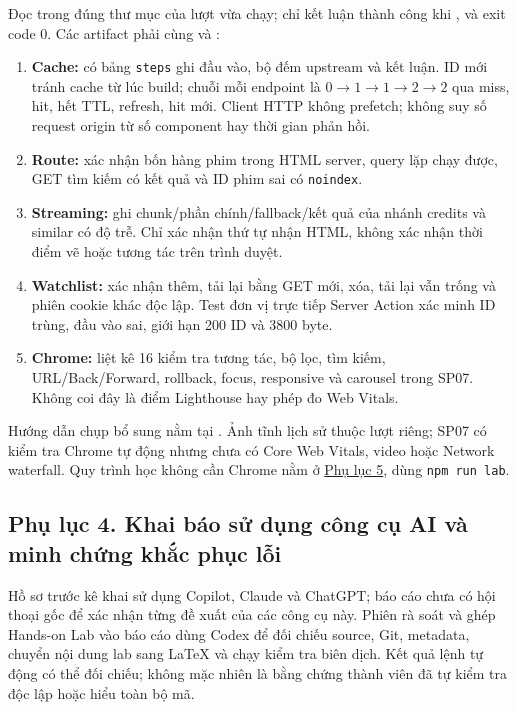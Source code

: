 \documentclass[12pt,a4paper]{extarticle}
\begin{document}
Đọc  trong đúng thư mục của lượt vừa chạy; chỉ kết luận thành công khi ,  và exit code 0. Các artifact phải cùng  và :
\begin{enumerate}[noitemsep]
    \item \textbf{Cache:}  có bảng \texttt{steps} ghi đầu vào, bộ đếm upstream và kết luận. ID mới tránh cache từ lúc build; chuỗi mỗi endpoint là $0\to1\to1\to2\to2$ qua miss, hit, hết TTL, refresh, hit mới. Client HTTP không prefetch; không suy số request origin từ số component hay thời gian phản hồi.
    \item \textbf{Route:}  xác nhận bốn hàng phim trong HTML server, query lặp chạy được, GET tìm kiếm có kết quả và ID phim sai có \texttt{noindex}.
    \item \textbf{Streaming:}  ghi chunk/phần chính/fallback/kết quả của nhánh credits và similar có độ trễ. Chỉ xác nhận thứ tự nhận HTML, không xác nhận thời điểm vẽ hoặc tương tác trên trình duyệt.
    \item \textbf{Watchlist:}  xác nhận thêm, tải lại bằng GET mới, xóa, tải lại vẫn trống và phiên cookie khác độc lập. Test đơn vị trực tiếp Server Action xác minh ID trùng, đầu vào sai, giới hạn 200 ID và 3800 byte.
    \item \textbf{Chrome:}  liệt kê 16 kiểm tra tương tác, bộ lọc, tìm kiếm, URL/Back/Forward, rollback, focus, responsive và carousel trong SP07. Không coi đây là điểm Lighthouse hay phép đo Web Vitals.
\end{enumerate}
Hướng dẫn chụp bổ sung nằm tại . Ảnh tĩnh lịch sử thuộc lượt riêng; SP07 có kiểm tra Chrome tự động nhưng chưa có Core Web Vitals, video hoặc Network waterfall. Quy trình học không cần Chrome nằm ở \hyperref[app:hands_on_lab]{Phụ lục 5}, dùng \texttt{npm run lab}.

\subsection*{Phụ lục 4. Khai báo sử dụng công cụ AI và minh chứng khắc phục lỗi}
Hồ sơ trước kê khai sử dụng Copilot, Claude và ChatGPT; báo cáo chưa có hội thoại gốc để xác nhận từng đề xuất của các công cụ này. Phiên rà soát và ghép Hands-on Lab vào báo cáo dùng Codex để đối chiếu source, Git, metadata, chuyển nội dung lab sang LaTeX và chạy kiểm tra biên dịch. Kết quả lệnh tự động có thể đối chiếu; không mặc nhiên là bằng chứng thành viên đã tự kiểm tra độc lập hoặc hiểu toàn bộ mã.
\end{document}
